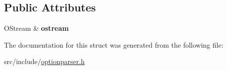 \subsection*{Public Attributes}
\begin{DoxyCompactItemize}
\item 
\hypertarget{structxmem_1_1config_1_1third__party_1_1_print_usage_implementation_1_1_o_stream_writer_ab85a98667ea62652a59042c8ee354ab5}{O\-Stream \& {\bfseries ostream}}\label{structxmem_1_1config_1_1third__party_1_1_print_usage_implementation_1_1_o_stream_writer_ab85a98667ea62652a59042c8ee354ab5}

\end{DoxyCompactItemize}


The documentation for this struct was generated from the following file\-:\begin{DoxyCompactItemize}
\item 
src/include/\hyperlink{optionparser_8h}{optionparser.\-h}\end{DoxyCompactItemize}
